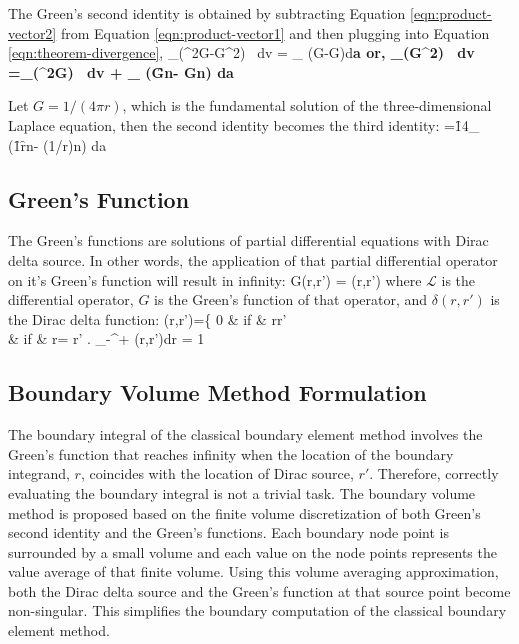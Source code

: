 The Green's second identity is obtained by
subtracting Equation \ref{eqn:product-vector2} from Equation \ref{eqn:product-vector1} and then plugging into Equation \ref{eqn:theorem-divergence},
\be
\int_{\Omega}(\Phi\n^2G-G\n^2\Phi) \ dv = \int_{\p \Omega} (\Phi\n G-G\n\Phi)\cd d\bf{a}
\ee
or,
\be
\int_{\Omega}(G\n^2\Phi) \ dv  =\int_{\Omega}(\Phi\n^2G) \ dv + \int_{\p \Omega} (G\f{\p\Phi}{\p n}-\Phi\f{ \p G}{\p n}) da
\label{eqn:GreenSecondIdentity}
\ee

Let $G=1/(4\pi r)$, which is the fundamental solution of the three-dimensional Laplace equation, then the second identity becomes the third identity:
\be
\Phi=\f{1}{4\pi}\int_{\p \Omega} (\f{1}{r}\f{\p\Phi}{\p n}-\Phi\f{ \p (1/r)}{\p n}) da
\ee

\subsection{Green's Function}
\label{subsection:GreenFunction}

The Green's functions are solutions of partial differential equations with Dirac delta source. In other words, the application of that partial differential operator on it's Green's function will result in infinity:
\be
{} G(r,r') = \delta(r,r')
\ee
where $\mathcal{L}$ is the differential operator, $G$ is the Green's function of that operator, and $\delta(r,r')$ is the Dirac delta function:
\be
\delta(r,r')=\left\{
0 \hst & if & r\neq r' \\
\infty \hst & if & r= r'
\eaa
\right.
\ee
\be
\int_{-\infty}^{+\infty} \delta(r,r')dr = 1
\ee

\subsection{Boundary Volume Method Formulation}
The boundary integral of the classical boundary element method involves the Green's function that reaches infinity when the location of the boundary integrand, $r$, coincides with the location of Dirac source, $r'$. Therefore, correctly evaluating the boundary integral is not a trivial task. The boundary volume method is proposed based on the finite volume discretization of both Green's second identity and the Green's functions. Each boundary node point is surrounded by a small volume and each value on the node points represents the value average of that finite volume. Using this volume averaging approximation, both the Dirac delta source and the Green's function at that source point become non-singular. This simplifies the boundary computation of the classical boundary element method.

